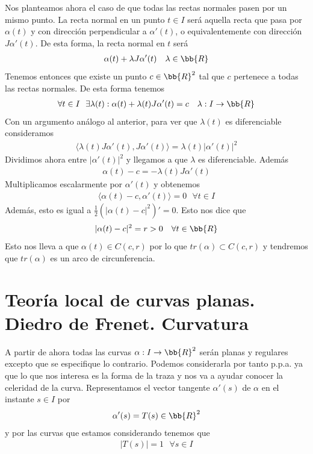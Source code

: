 \begin{ejercicio}
    Nos planteamos ahora el caso de que todas las rectas normales pasen por un mismo punto. La recta normal en un punto $t\in I$ será aquella recta que pasa por $\alpha(t)$ y con dirección perpendicular a $\alpha'(t)$, o equivalentemente con dirección $J\alpha'(t)$. De esta forma, la recta normal en $t$ será 
    \begin{gather*}
        \alpha(t) + \lambda J \alpha'(t)\ \ \ \lambda \in \bb{R}
    \end{gather*}
    Tenemos entonces que existe un punto $c\in \bb{R}^2$ tal que $c$ pertenece a todas las rectas normales. De esta forma tenemos 
    \begin{gather*}
        \forall t \in I\ \ \exists \lambda(t) : \alpha(t) + \lambda(t)J\alpha'(t) = c\ \ \ \lambda:I\to \bb{R}
    \end{gather*}
    Con un argumento análogo al anterior, para ver que $\lambda(t)$ es diferenciable consideramos
    \begin{gather*}
        \langle \lambda(t)J\alpha'(t), J\alpha'(t)\rangle = \lambda(t)|\alpha'(t)|^2
    \end{gather*}
    Dividimos ahora entre $|\alpha'(t)|^2$ y llegamos a que $\lambda$ es diferenciable. Además
    \begin{gather*}
        \alpha(t)-c = -\lambda(t)J\alpha'(t)
    \end{gather*}
    Multiplicamos escalarmente por $\alpha'(t)$ y obtenemos
    \begin{gather*}
        \langle \alpha(t)-c, \alpha'(t) \rangle = 0 \ \ \ \forall t \in I
    \end{gather*}
    Además, esto es igual a $\frac{1}{2}(|\alpha(t)-c|^2)'=0$. Esto nos dice que 
    \begin{gather*}
        |\alpha(t)-c|^2 = r > 0\ \ \ \forall t \in \bb{R}
    \end{gather*}
    Esto nos lleva a que $\alpha(t)\in C(c,r)$ por lo que $tr(\alpha)\subset C(c,r)$ y tendremos que $tr(\alpha)$ es un arco de circunferencia.
\end{ejercicio}

\section{Teoría local de curvas planas. Diedro de Frenet. Curvatura}

\begin{notacion}
    A partir de ahora todas las curvas  $\alpha: I \to \bb{R}^2$ serán planas y regulares excepto que se especifique lo contrario. Podemos considerarla por tanto p.p.a. ya que lo que nos interesa es la forma de la traza y nos va a ayudar conocer la celeridad de la curva. Representamos el vector tangente $\alpha'(s)$ de $\alpha$ en el instante $s\in I$ por
    \begin{gather*}
        \alpha'(s) = T(s) \in \bb{R}^2
    \end{gather*}
    y por las curvas que estamos considerando tenemos que 
    \begin{gather*}
        |T(s)| = 1\ \ \ \forall s \in I
    \end{gather*}
\end{notacion}

